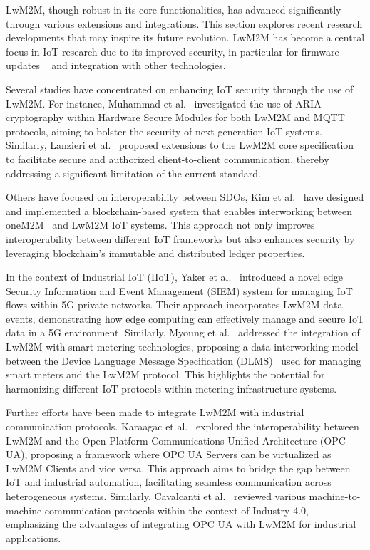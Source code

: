 \documentclass[11pt,sigconf]{iabart}
\begin{document}
LwM2M, though robust in its core functionalities, has advanced significantly through various extensions and integrations. This section explores recent research developments that may inspire its future evolution. LwM2M has become a central focus in IoT research due to its improved security, in particular for firmware updates ~\cite{8725488} and integration with other technologies. 

Several studies have concentrated on enhancing IoT security through the use of LwM2M. For instance, Muhammad et al.~\cite{pop00001} investigated the use of ARIA cryptography within Hardware Secure Modules for both LwM2M and MQTT protocols, aiming to bolster the security of next-generation IoT systems. Similarly, Lanzieri et al.~\cite{pop00011} proposed extensions to the LwM2M core specification to facilitate secure and authorized client-to-client communication, thereby addressing a significant limitation of the current standard.

Others have focused on interoperability between SDOs, Kim et al.~\cite{pop00007} have designed and implemented a blockchain-based system that enables interworking between oneM2M~\cite{oneM2M-spec} and LwM2M IoT systems. This approach not only improves interoperability between different IoT frameworks but also enhances security by leveraging blockchain's immutable and distributed ledger properties.

In the context of Industrial IoT (IIoT), Yaker et al.~\cite{pop00004} introduced a novel edge Security Information and Event Management (SIEM) system for managing IoT flows within 5G private networks. Their approach incorporates LwM2M data events, demonstrating how edge computing can effectively manage and secure IoT data in a 5G environment. Similarly, Myoung et al.~\cite{pop00012} addressed the integration of LwM2M with smart metering technologies, proposing a data interworking model between the Device Language Message Specification (DLMS)~\cite{dlms-spec} used for managing smart meters and the LwM2M protocol. This highlights the potential for harmonizing different IoT protocols within metering infrastructure systems.

Further efforts have been made to integrate LwM2M with industrial communication protocols. Karaagac et al.~\cite{pop00013} explored the interoperability between LwM2M and the Open Platform Communications Unified Architecture (OPC UA), proposing a framework where OPC UA Servers can be virtualized as LwM2M Clients and vice versa. This approach aims to bridge the gap between IoT and industrial automation, facilitating seamless communication across heterogeneous systems. Similarly, Cavalcanti et al.~\cite{pop00014} reviewed various machine-to-machine communication protocols within the context of Industry 4.0, emphasizing the advantages of integrating OPC UA with LwM2M for industrial applications.
\end{document}
